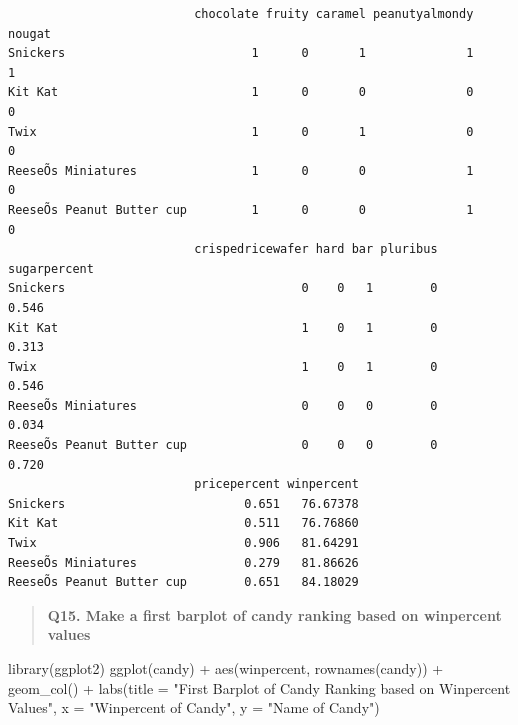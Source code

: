 \documentclass[
  letterpaper,
  DIV=11,
  numbers=noendperiod]{scrartcl}
\newenvironment{Shaded}{\begin{snugshade}}{\end{snugshade}}
\newcommand{\AttributeTok}[1]{\textcolor[rgb]{0.40,0.45,0.13}{#1}}
\newcommand{\FunctionTok}[1]{\textcolor[rgb]{0.28,0.35,0.67}{#1}}
\newcommand{\NormalTok}[1]{\textcolor[rgb]{0.00,0.23,0.31}{#1}}
\newcommand{\SpecialCharTok}[1]{\textcolor[rgb]{0.37,0.37,0.37}{#1}}
\newcommand{\StringTok}[1]{\textcolor[rgb]{0.13,0.47,0.30}{#1}}
\begin{document}
\begin{verbatim}
                          chocolate fruity caramel peanutyalmondy nougat
Snickers                          1      0       1              1      1
Kit Kat                           1      0       0              0      0
Twix                              1      0       1              0      0
ReeseÕs Miniatures                1      0       0              1      0
ReeseÕs Peanut Butter cup         1      0       0              1      0
                          crispedricewafer hard bar pluribus sugarpercent
Snickers                                 0    0   1        0        0.546
Kit Kat                                  1    0   1        0        0.313
Twix                                     1    0   1        0        0.546
ReeseÕs Miniatures                       0    0   0        0        0.034
ReeseÕs Peanut Butter cup                0    0   0        0        0.720
                          pricepercent winpercent
Snickers                         0.651   76.67378
Kit Kat                          0.511   76.76860
Twix                             0.906   81.64291
ReeseÕs Miniatures               0.279   81.86626
ReeseÕs Peanut Butter cup        0.651   84.18029
\end{verbatim}

\begin{quote}
\textbf{Q15. Make a first barplot of candy ranking based on winpercent
values}
\end{quote}

\begin{Shaded}
\begin{Highlighting}[]
\FunctionTok{library}\NormalTok{(ggplot2)}
\FunctionTok{ggplot}\NormalTok{(candy) }\SpecialCharTok{+} 
  \FunctionTok{aes}\NormalTok{(winpercent, }\FunctionTok{rownames}\NormalTok{(candy)) }\SpecialCharTok{+}
  \FunctionTok{geom\_col}\NormalTok{() }\SpecialCharTok{+}
  \FunctionTok{labs}\NormalTok{(}\AttributeTok{title =} \StringTok{"First Barplot of Candy Ranking based on Winpercent Values"}\NormalTok{, }
       \AttributeTok{x =} \StringTok{"Winpercent of Candy"}\NormalTok{, }\AttributeTok{y =} \StringTok{"Name of Candy"}\NormalTok{)}
\end{Highlighting}
\end{Shaded}
\end{document}
